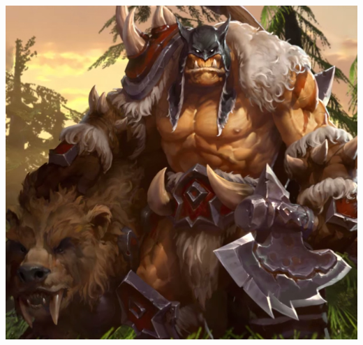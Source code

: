 \documentclass[letterpaper,10pt,twoside,twocolumn,openany]{book}
\begin{document}
\begin{center}
	\includegraphics[width=\linewidth]{img/RexxarArt.jpg}
\end{center}
\end{document}

